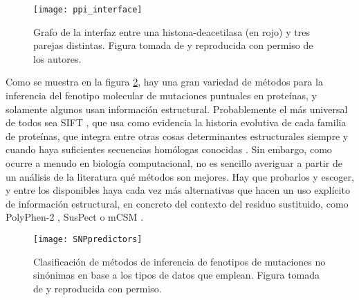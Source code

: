 \begin{figure}
\begin{center} 
\texttt{[image: ppi\_interface]}
\caption%
{
Grafo de la interfaz entre una histona-deacetilasa (en rojo) y tres parejas distintas.
Figura tomada de \citet{Cukuroglu2014} y reproducida con permiso de los autores.
}
\label{fig:ppi_interface}
\end{center}
\end{figure}


Como se muestra en la figura \ref{fig:SNPpredictors}, hay una gran variedad de m\'{e}todos para la inferencia del fenotipo
molecular de mutaciones puntuales en prote\'{i}nas, y solamente algunos usan informaci\'{o}n estructural.
Probablemente el m\'{a}s universal de todos sea SIFT \citep{Kumar2009}, que usa como evidencia la
historia evolutiva de cada familia de prote\'{i}nas, que integra entre otras cosas determinantes estructurales
siempre y cuando haya suficientes secuencias hom\'{o}logas conocidas \citep{Saunders2002}. 
Sin embargo, como ocurre a menudo en biolog\'{i}a computacional, no es sencillo averiguar a partir de un
an\'{a}lisis de la literatura qu\'{e} m\'{e}todos son mejores. Hay que probarlos y escoger, y entre los
disponibles haya cada vez m\'{a}s alternativas que hacen un uso expl\'{i}cito de informaci\'{o}n
estructural, en concreto del contexto del residuo sustituido, como PolyPhen-2 \citep{Adzhubei2010},
SusPect \citep{Yates2014} o mCSM \citep{Pires2014}.

\begin{figure}
\begin{center} 
\texttt{[image: SNPpredictors]}
\caption%
{
Clasificaci\'{o}n de m\'{e}todos de inferencia de fenotipos de mutaciones no sin\'{o}nimas en base a los tipos de datos que emplean.
Figura tomada de \citet{Peterson2013} y reproducida con permiso.
}
\label{fig:SNPpredictors}
\end{center}
\end{figure}

